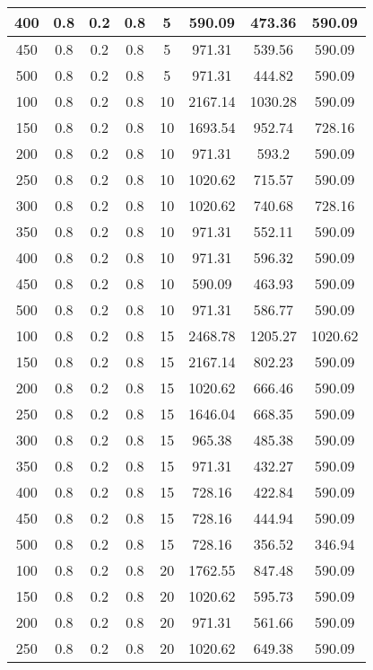\documentclass[a4paper, 12pt]{extreport}
\begin{document}
\begin{itemize}
\begin{longtable}{|c|c|c|c|c|c|c|c|}
			400 & 0.8 & 0.2 & 0.8 & 5 & 590.09 & 473.36 & 590.09 \\\hline
			450 & 0.8 & 0.2 & 0.8 & 5 & 971.31 & 539.56 & 590.09 \\\hline
			500 & 0.8 & 0.2 & 0.8 & 5 & 971.31 & 444.82 & 590.09 \\\hline
			100 & 0.8 & 0.2 & 0.8 & 10 & 2167.14 & 1030.28 & 590.09 \\\hline
			150 & 0.8 & 0.2 & 0.8 & 10 & 1693.54 & 952.74 & 728.16 \\\hline
			200 & 0.8 & 0.2 & 0.8 & 10 & 971.31 & 593.2 & 590.09 \\\hline
			250 & 0.8 & 0.2 & 0.8 & 10 & 1020.62 & 715.57 & 590.09 \\\hline
			300 & 0.8 & 0.2 & 0.8 & 10 & 1020.62 & 740.68 & 728.16 \\\hline
			350 & 0.8 & 0.2 & 0.8 & 10 & 971.31 & 552.11 & 590.09 \\\hline
			400 & 0.8 & 0.2 & 0.8 & 10 & 971.31 & 596.32 & 590.09 \\\hline
			450 & 0.8 & 0.2 & 0.8 & 10 & 590.09 & 463.93 & 590.09 \\\hline
			500 & 0.8 & 0.2 & 0.8 & 10 & 971.31 & 586.77 & 590.09 \\\hline
			100 & 0.8 & 0.2 & 0.8 & 15 & 2468.78 & 1205.27 & 1020.62 \\\hline
			150 & 0.8 & 0.2 & 0.8 & 15 & 2167.14 & 802.23 & 590.09 \\\hline
			200 & 0.8 & 0.2 & 0.8 & 15 & 1020.62 & 666.46 & 590.09 \\\hline
			250 & 0.8 & 0.2 & 0.8 & 15 & 1646.04 & 668.35 & 590.09 \\\hline
			300 & 0.8 & 0.2 & 0.8 & 15 & 965.38 & 485.38 & 590.09 \\\hline
			350 & 0.8 & 0.2 & 0.8 & 15 & 971.31 & 432.27 & 590.09 \\\hline
			400 & 0.8 & 0.2 & 0.8 & 15 & 728.16 & 422.84 & 590.09 \\\hline
			450 & 0.8 & 0.2 & 0.8 & 15 & 728.16 & 444.94 & 590.09 \\\hline
			500 & 0.8 & 0.2 & 0.8 & 15 & 728.16 & 356.52 & 346.94 \\\hline
			100 & 0.8 & 0.2 & 0.8 & 20 & 1762.55 & 847.48 & 590.09 \\\hline
			150 & 0.8 & 0.2 & 0.8 & 20 & 1020.62 & 595.73 & 590.09 \\\hline
			200 & 0.8 & 0.2 & 0.8 & 20 & 971.31 & 561.66 & 590.09 \\\hline
			250 & 0.8 & 0.2 & 0.8 & 20 & 1020.62 & 649.38 & 590.09 \\\hline

\end{longtable}
\end{itemize}
\end{document}
